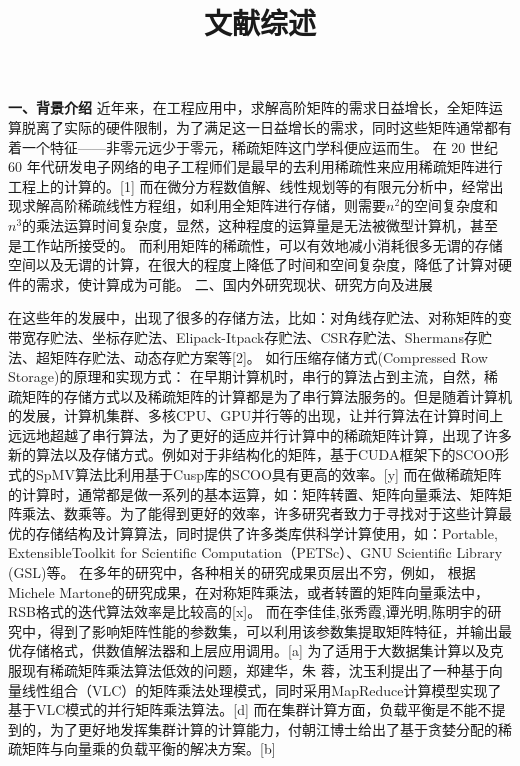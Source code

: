 \documentclass{article}
\begin{document}
  

\title{文献综述}
\date{}

\maketitle


\textbf{一、背景介绍}
      \qquad
\newline
      \qquad
      近年来，在工程应用中，求解高阶矩阵的需求日益增长，全矩阵运算脱离了实际的硬件限制，为了满足这一日益增长的需求，同时这些矩阵通常都有着一个特征——非零元远少于零元，稀疏矩阵这门学科便应运而生。
在 20 世纪 60 年代研发电子网络的电子工程师们是最早的去利用稀疏性来应用稀疏矩阵进行工程上的计算的。[1]
而在微分方程数值解、线性规划等的有限元分析中，经常出现求解高阶稀疏线性方程组，如利用全矩阵进行存储，则需要$n^2$的空间复杂度和$n^3$的乘法运算时间复杂度，显然，这种程度的运算量是无法被微型计算机，甚至是工作站所接受的。
而利用矩阵的稀疏性，可以有效地减小消耗很多无谓的存储空间以及无谓的计算，在很大的程度上降低了时间和空间复杂度，降低了计算对硬件的需求，使计算成为可能。
\newline
二、国内外研究现状、研究方向及进展\newline

在这些年的发展中，出现了很多的存储方法，比如：对角线存贮法、对称矩阵的变带宽存贮法、坐标存贮法、Elipack-Itpack存贮法、CSR存贮法、Shermans存贮法、超矩阵存贮法、动态存贮方案等[2]。
\newline
如行压缩存储方式(Compressed Row Storage)的原理和实现方式：
\newline
在早期计算机时，串行的算法占到主流，自然，稀疏矩阵的存储方式以及稀疏矩阵的计算都是为了串行算法服务的。但是随着计算机的发展，计算机集群、多核CPU、GPU并行等的出现，让并行算法在计算时间上远远地超越了串行算法，为了更好的适应并行计算中的稀疏矩阵计算，出现了许多新的算法以及存储方式。例如对于非结构化的矩阵，基于CUDA框架下的SCOO形式的SpMV算法比利用基于Cusp库的SCOO具有更高的效率。[y]
\newline
而在做稀疏矩阵的计算时，通常都是做一系列的基本运算，如：矩阵转置、矩阵向量乘法、矩阵矩阵乘法、数乘等。为了能得到更好的效率，许多研究者致力于寻找对于这些计算最优的存储结构及计算算法，同时提供了许多类库供科学计算使用，如：Portable, ExtensibleToolkit for Scientific Computation（PETSc）、GNU Scientific Library (GSL)等。
在多年的研究中，各种相关的研究成果页层出不穷，例如，
根据Michele Martone的研究成果，在对称矩阵乘法，或者转置的矩阵向量乘法中，RSB格式的迭代算法效率是比较高的[x]。
而在李佳佳,张秀霞,谭光明,陈明宇的研究中，得到了影响矩阵性能的参数集，可以利用该参数集提取矩阵特征，并输出最优存储格式，供数值解法器和上层应用调用。[a]
为了适用于大数据集计算以及克服现有稀疏矩阵乘法算法低效的问题，郑建华，朱 蓉，沈玉利提出了一种基于向量线性组合（VLC）的矩阵乘法处理模式，同时采用MapReduce计算模型实现了基于VLC模式的并行矩阵乘法算法。[d]
而在集群计算方面，负载平衡是不能不提到的，为了更好地发挥集群计算的计算能力，付朝江博士给出了基于贪婪分配的稀疏矩阵与向量乘的负载平衡的解决方案。[b]
\newline
\end{document}
